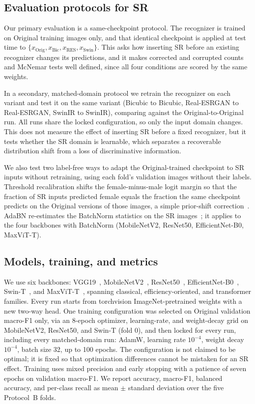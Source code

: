 \documentclass[conference]{IEEEtran}
\begin{document}
\subsection{Evaluation protocols for SR}\label{sec:protocols}
Our primary evaluation is a same-checkpoint protocol. The recognizer is trained on Original training images only, and that identical checkpoint is applied at test time to $\{x_{\text{Orig}}, x_{\text{Bic}}, x_{\text{RES}}, x_{\text{Swin}}\}$. This asks how inserting SR before an existing recognizer changes its predictions, and it makes corrected and corrupted counts and McNemar tests well defined, since all four conditions are scored by the same weights.

In a secondary, matched-domain protocol we retrain the recognizer on each variant and test it on the same variant (Bicubic to Bicubic, Real-ESRGAN to Real-ESRGAN, SwinIR to SwinIR), comparing against the Original-to-Original run. All runs share the locked configuration, so only the input domain changes. This does not measure the effect of inserting SR before a fixed recognizer, but it tests whether the SR domain is learnable, which separates a recoverable distribution shift from a loss of discriminative information.

We also test two label-free ways to adapt the Original-trained checkpoint to SR inputs without retraining, using each fold's validation images without their labels. Threshold recalibration shifts the female-minus-male logit margin so that the fraction of SR inputs predicted female equals the fraction the same checkpoint predicts on the Original versions of those images, a simple prior-shift correction~\cite{saerens2002}. AdaBN re-estimates the BatchNorm statistics on the SR images~\cite{li2018adabn}; it applies to the four backbones with BatchNorm (MobileNetV2, ResNet50, EfficientNet-B0, MaxViT-T).

\subsection{Models, training, and metrics}
We use six backbones: VGG19~\cite{vgg}, MobileNetV2~\cite{mobilenetv2}, ResNet50~\cite{resnet}, EfficientNet-B0~\cite{efficientnet}, Swin-T~\cite{swintransformer}, and MaxViT-T~\cite{maxvit}, spanning classical, efficiency-oriented, and transformer families. Every run starts from torchvision ImageNet-pretrained weights with a new two-way head. One training configuration was selected on Original validation macro-F1 only, via an 8-epoch optimizer, learning-rate, and weight-decay grid on MobileNetV2, ResNet50, and Swin-T (fold 0), and then locked for every run, including every matched-domain run: AdamW, learning rate $10^{-4}$, weight decay $10^{-4}$, batch size 32, up to 100 epochs. The configuration is not claimed to be optimal; it is fixed so that optimization differences cannot be mistaken for an SR effect. Training uses mixed precision and early stopping with a patience of seven epochs on validation macro-F1. We report accuracy, macro-F1, balanced accuracy, and per-class recall as mean $\pm$ standard deviation over the five Protocol~B folds.
\end{document}
